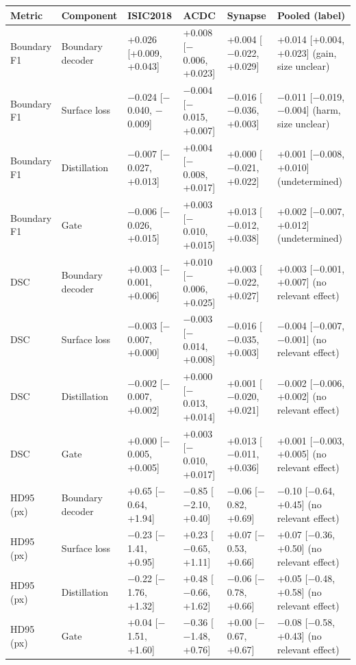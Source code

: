 \begin{tabular}{llllll}
\toprule
Metric & Component & ISIC2018 & ACDC & Synapse & Pooled (label) \\
\midrule
Boundary F1 & Boundary decoder & +0.026 [+0.009, +0.043] & +0.008 [$-$0.006, +0.023] & +0.004 [$-$0.022, +0.029] & +0.014 [+0.004, +0.023] (gain, size unclear) \\
Boundary F1 & Surface loss & $-$0.024 [$-$0.040, $-$0.009] & $-$0.004 [$-$0.015, +0.007] & $-$0.016 [$-$0.036, +0.003] & $-$0.011 [$-$0.019, $-$0.004] (harm, size unclear) \\
Boundary F1 & Distillation & $-$0.007 [$-$0.027, +0.013] & +0.004 [$-$0.008, +0.017] & +0.000 [$-$0.021, +0.022] & +0.001 [$-$0.008, +0.010] (undetermined) \\
Boundary F1 & Gate & $-$0.006 [$-$0.026, +0.015] & +0.003 [$-$0.010, +0.015] & +0.013 [$-$0.012, +0.038] & +0.002 [$-$0.007, +0.012] (undetermined) \\
\midrule
DSC & Boundary decoder & +0.003 [$-$0.001, +0.006] & +0.010 [$-$0.006, +0.025] & +0.003 [$-$0.022, +0.027] & +0.003 [$-$0.001, +0.007] (no relevant effect) \\
DSC & Surface loss & $-$0.003 [$-$0.007, +0.000] & $-$0.003 [$-$0.014, +0.008] & $-$0.016 [$-$0.035, +0.003] & $-$0.004 [$-$0.007, $-$0.001] (no relevant effect) \\
DSC & Distillation & $-$0.002 [$-$0.007, +0.002] & +0.000 [$-$0.013, +0.014] & +0.001 [$-$0.020, +0.021] & $-$0.002 [$-$0.006, +0.002] (no relevant effect) \\
DSC & Gate & +0.000 [$-$0.005, +0.005] & +0.003 [$-$0.010, +0.017] & +0.013 [$-$0.011, +0.036] & +0.001 [$-$0.003, +0.005] (no relevant effect) \\
\midrule
HD95 (px) & Boundary decoder & +0.65 [$-$0.64, +1.94] & $-$0.85 [$-$2.10, +0.40] & $-$0.06 [$-$0.82, +0.69] & $-$0.10 [$-$0.64, +0.45] (no relevant effect) \\
HD95 (px) & Surface loss & $-$0.23 [$-$1.41, +0.95] & +0.23 [$-$0.65, +1.11] & +0.07 [$-$0.53, +0.66] & +0.07 [$-$0.36, +0.50] (no relevant effect) \\
HD95 (px) & Distillation & $-$0.22 [$-$1.76, +1.32] & +0.48 [$-$0.66, +1.62] & $-$0.06 [$-$0.78, +0.66] & +0.05 [$-$0.48, +0.58] (no relevant effect) \\
HD95 (px) & Gate & +0.04 [$-$1.51, +1.60] & $-$0.36 [$-$1.48, +0.76] & +0.00 [$-$0.67, +0.67] & $-$0.08 [$-$0.58, +0.43] (no relevant effect) \\
\bottomrule
\end{tabular}
